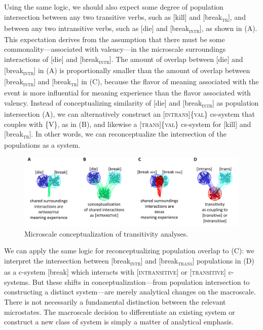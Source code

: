   Using the same logic, we should also expect some degree of population intersection between any two transitive verbs, such as [kill] and [break\textsc{\textsubscript{tr}}], and between any two intransitive verbs, such as [die] and [break\textsc{\textsubscript{intr}}], as shown in {}(A). This expectation derives from the assumption that there must be some commonality—associated with valency—in the microscale surroundings interactions of [die] and [break\textsc{\textsubscript{intr}}]. The amount of overlap between [die] and [break\textsc{\textsubscript{intr}}] in (A) is proportionally smaller than the amount of overlap between [break\textsc{\textsubscript{intr}}] and [break\textsc{\textsubscript{tr}}] in (C), because the flavor of meaning associated with the event is more influential for meaning experience than the flavor associated with valency. Instead of conceptualizing similarity of [die] and [break\textsc{\textsubscript{intr}}] as population intersection (A), we can alternatively construct an [\textsc{intrans}]\{\textsc{val}\} cs-system that couples with \{V\}, as in (B), and likewise a [\textsc{trans}]\{\textsc{val}\} cs-system for [kill] and [break\textsc{\textsubscript{tr}}]. In other words, we can reconceptualize the intersection of the populations as a system.

  
\begin{figure}
\includegraphics[width=\textwidth]{figures/Tilsen-img73.png}
\caption{Microscale conceptualization of transitivity analyses.}
\label{fig:4:23}
\end{figure}
 

  We can apply the same logic for reconceptualizing population overlap to (C): we interpret the intersection between [break\textsubscript{\textsc{intr}}] and [break\textsubscript{\textsc{trans}}] populations in (D) as a c-system [break] which interacts with [\textsc{intransitive}] or [\textsc{transitive}] c-systems. But these shifts in conceptualization—from population intersection to constructing a distinct system—are merely analytical changes on the macroscale. There is not necessarily a fundamental distinction between the relevant microstates. The macroscale decision to differentiate an existing system or construct a new class of system is simply a matter of analytical emphasis.

